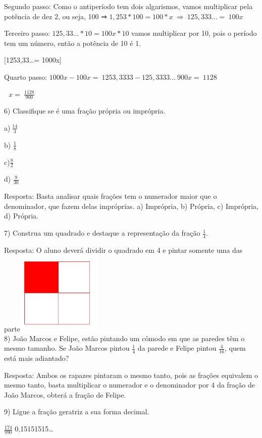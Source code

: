 Segundo passo: Como o antiperíodo tem dois algarismos, vamos multiplicar
pela potência de dez 2, ou seja, 100 ⇒
\(1,253*100 = 100*x\  \Rightarrow \ 125,333\ldots = \ 100x\)

Terceiro passo: \(125,33\ldots*10 = 100x*10\) vamos multiplicar por 10,
pois o período tem um número, então a potência de 10 é 1.

[1253,33\ldots = 1000x]

Quarto passo:
\(1000x - 100x = \ 1253,3333 - 125,3333\ldots\ 900x = \ 1128\)

\(\text{\ \ \ \ \ \ \ \ \ \ \ \ \ \ \ \ \ \ \ \ \ \ \ \ \ \ \ \ \ \ \ \ \ \ \ \ \ \ \ \ \ \ \ \ \ \ \ \ \ \ \ \ \ \ }x = \ \frac{1128}{900}\)

6) Classifique se é uma fração própria ou imprópria.

a)\(\ \frac{14}{3}\)

b) \(\frac{1}{8}\)

c)\(\frac{8}{2}\)

d) \(\frac{9}{30}\)

Resposta: Basta analisar quais frações tem o numerador maior que o
denominador, que fazem delas impróprias. a) Imprópria, b) Própria, c)
Imprópria, d) Própria.

7) Construa um quadrado e destaque a representação da fração
\(\frac{1}{4}\).

Resposta: O aluno deverá dividir o quadrado em 4 e pintar somente uma
das
parte\includegraphics[width=1.60536in,height=1.56845in]{./imgSAEB_7_MAT/media/image9.png}\\
8) João Marcos e Felipe, estão pintando um cômodo em que as paredes têm
o mesmo tamanho. Se João Marcos pintou \(\frac{1}{4}\) da parede e
Felipe pintou \(\frac{4}{16}\), quem está mais adiantado?

Resposta: Ambos os rapazes pintaram o mesmo tanto, pois as frações
equivalem o mesmo tanto, basta multiplicar o numerador e o denominador
por 4 da fração de João Marcos, obterá a fração de Felipe.

9) Ligue a fração geratriz a sua forma decimal.

\(\frac{174}{990}\) 0,15151515\ldots{}

